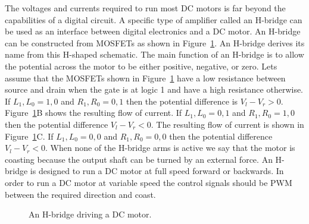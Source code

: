                             The voltages and currents required to run most DC motors is
                            far beyond the capabilities of a digital circuit.  A specific
                            type of amplifier called an H-bridge can be used as an interface
                            between digital electronics and a DC motor.  An H-bridge can be
                            constructed from MOSFETs as shown in
                            Figure~\ref{fig:commonPeripheralComponentshbridge}.  An H-bridge derives its name from
                            this  H-shaped schematic.  The main function of an H-bridge is
                            to allow the potential across the motor to be either positive,
                            negative, or zero.  Lets assume that the MOSFETs shown in
                            Figure~\ref{fig:commonPeripheralComponentshbridge} have a low resistance between source and
                            drain when the gate is at logic 1 and have a high resistance
                            otherwise.  If $L_1,L_0 = 1,0$ and $R_1,R_0 = 0,1$ then the
                            potential difference is $V_l - V_r > 0$.
                            Figure~\ref{fig:commonPeripheralComponentshbridge}B shows the resulting flow of current.
                            If $L_1,L_0 = 0,1$ and $R_1,R_0 = 1,0$ then the
                            potential difference $V_l - V_r < 0$.  The resulting flow of
                            current is shown in Figure~\ref{fig:commonPeripheralComponentshbridge}C.
                            If $L_1,L_0 = 0,0$ and $R_1,R_0 = 0,0$ then the potential difference
                            $V_l - V_r < 0$. When none of the H-bridge arms is active we say that
                            the motor is coasting because the output shaft
                            can be turned by an external force.  An H-bridge is designed
                            to run a DC motor at full speed forward or backwards.  In order
                            to run a DC motor at variable speed the control signals should be PWM
                            between the required direction and coast.

                            \begin{figure}[ht]
                                \caption{An H-bridge driving a DC motor.}
                                \label{fig:commonPeripheralComponentshbridge}
                            \end{figure}

